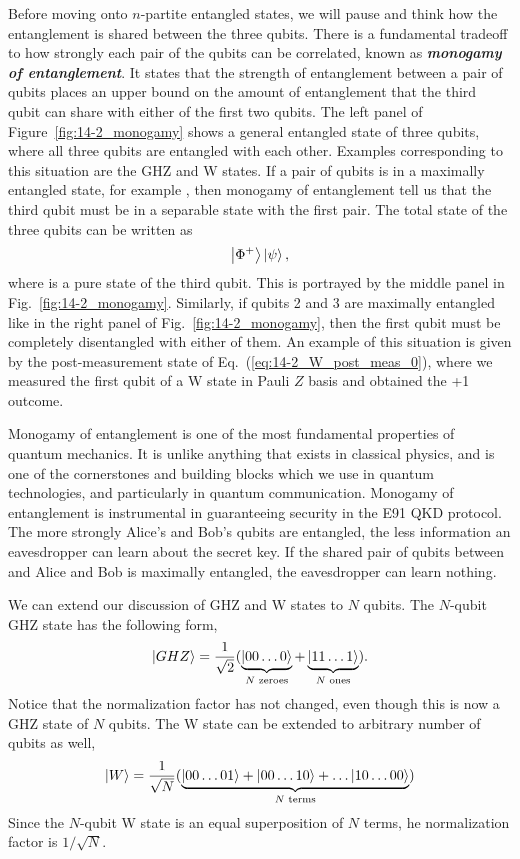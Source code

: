 Before moving onto $n$-partite entangled states, we will pause and think how the entanglement is shared between the three qubits.
There is a fundamental tradeoff to how strongly each pair of the qubits can be correlated, known as \textit{\textbf{monogamy of entanglement}}.
It states that the strength of entanglement between a pair of qubits places an upper bound on the amount of entanglement that the third qubit can share with either of the first two qubits.
The left panel of Figure~\ref{fig:14-2_monogamy} shows a general entangled state of three qubits, where all three qubits are entangled with each other.
Examples corresponding to this situation are the GHZ and W states.
If a pair of qubits is in a maximally entangled state, for example \ket{\Phi+}, then monogamy of entanglement tell us that the third qubit must be in a separable state with the first pair.
The total state of the three qubits can be written as
\begin{equation}
    \left| \Phi^+ \right\rangle\left| \psi \right\rangle,
\end{equation}
where \ket{\psi} is a pure state of the third qubit.
This is portrayed by the middle panel in Fig.~\ref{fig:14-2_monogamy}.
Similarly, if qubits 2 and 3 are maximally entangled like in the right panel of Fig.~\ref{fig:14-2_monogamy}, then the first qubit must be completely disentangled with either of them.
An example of this situation is given by the post-measurement state of Eq.~(\ref{eq:14-2_W_post_meas_0}), where we measured the first qubit of a W state in Pauli $Z$ basis and obtained the +1 outcome.

Monogamy of entanglement is one of the most fundamental properties of quantum mechanics. It is unlike anything that exists in classical physics, and is one of the cornerstones and building blocks which we use in quantum technologies, and particularly in quantum communication.
Monogamy of entanglement is instrumental in guaranteeing security in the E91 QKD protocol.
The more strongly Alice's and Bob's qubits are entangled, the less information an eavesdropper can learn about the secret key.
If the shared pair of qubits between and Alice and Bob is maximally entangled, the eavesdropper can learn nothing.

We can extend our discussion of GHZ and W states to $N$ qubits.
The $N$-qubit GHZ state has the following form,
\begin{equation}
    \left| GHZ \right\rangle = \frac{1}{\sqrt{2}} ( \underbrace{\left| 00\ldots0 \right\rangle}_{N\text{ zeroes}} + \underbrace{\left| 11\ldots1 \right\rangle}_{N \text{ ones}} ).
\end{equation}
Notice that the normalization factor has not changed, even though this is now a GHZ state of $N$ qubits.
The W state can be extended to arbitrary number of qubits as well,
\begin{equation}
    \left| W \right\rangle = \frac{1}{\sqrt{N}} ( \underbrace{\left| 00\ldots01 \right\rangle + \left| 00\ldots10 \right\rangle + \ldots \left| 10\ldots00 \right\rangle}_{N \text{ terms}} )
\end{equation}
Since the $N$-qubit W state is an equal superposition of $N$ terms, he normalization factor is $1 / \sqrt{N}$.

